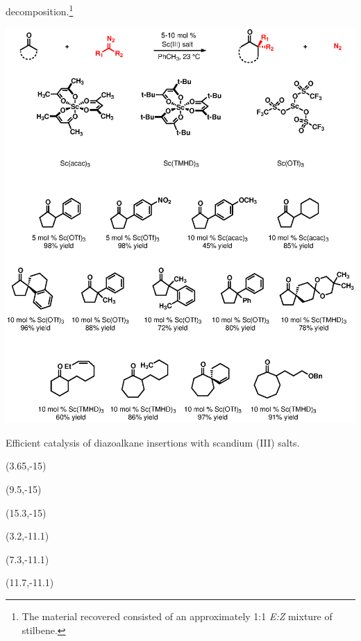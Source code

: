 decomposition.\footnote{The material recovered consisted of an approximately 1:1 \textit{E:Z}
mixture of stilbene.} \begin{Scheme}[p]
  \centering \includegraphics[scale=0.8]{chp_diazobkg/images/moebius}
  \vspace{10pt}
  \caption{Efficient catalysis of diazoalkane insertions with scandium (III) salts.}
 \begin{textblock}{1}(3.65,-15)  \end{textblock}
 \begin{textblock}{1}(9.5,-15)  \end{textblock}
 \begin{textblock}{1}(15.3,-15)  \end{textblock}
 \begin{textblock}{1}(3.2,-11.1)  \end{textblock}
 \begin{textblock}{1}(7.3,-11.1)  \end{textblock}
 \begin{textblock}{1}(11.7,-11.1)  \end{textblock}
  \label{sch:moebius}
\end{Scheme}


